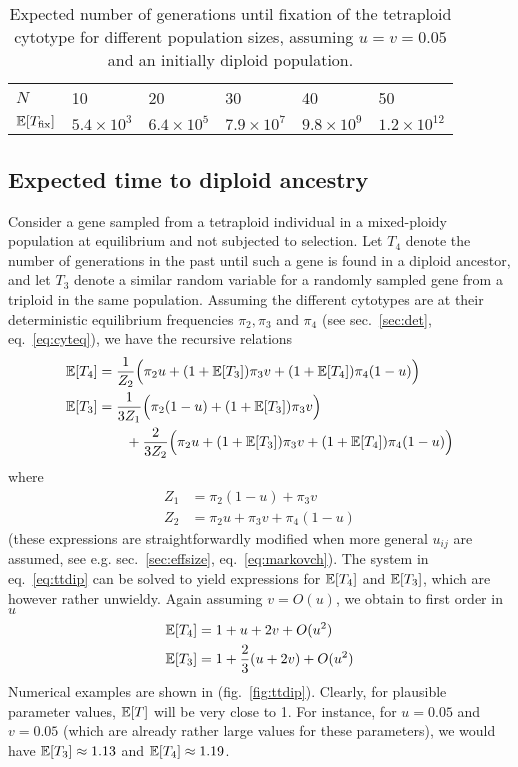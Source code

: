 \documentclass[11pt,a4paper]{article}
\begin{document}
\begin{table}[t]
\caption{
Expected number of generations until fixation of the tetraploid cytotype for
different population sizes, assuming $u=v=0.05$ and an initially diploid
population. \label{tbl:mchain-ex}
}
\begin{tabularx}{\linewidth}{XXXXXX}
\cline{1-6}
$N$ & 10 & 20 & 30 & 40 & 50 \\
\cline{1-6}
$\mathbb{E}[T_{\text{fix}}]$ & $5.4 \times 10^3$ & $6.4 \times 10^5$ & 
    $7.9 \times 10^7$ & $9.8 \times 10^9$ & $1.2 \times 10^{12}$ 
\end{tabularx}
\end{table}

\subsection{Expected time to diploid ancestry \label{sec:ttdip}}

Consider a gene sampled from a tetraploid individual in a mixed-ploidy
population at equilibrium and not subjected to selection. Let \(T_4\)
denote the number of generations in the past until such a gene is found
in a diploid ancestor, and let \(T_3\) denote a similar random variable
for a randomly sampled gene from a triploid in the same population.
Assuming the different cytotypes are at their deterministic equilibrium
frequencies \(\pi_2, \pi_3\) and \(\pi_4\) (see sec.~\ref{sec:det},
eq.~\ref{eq:cyteq}), we have the recursive relations \begin{align}
  \mathbb{E}[T_4] &= \frac{1}{Z_2}\Big(\pi_2u + (1+\mathbb{E}[T_3])\pi_3 v +
    (1+\mathbb{E}[T_4])\pi_4(1-u)\Big) \nonumber \\
  \mathbb{E}[T_3] &= \frac{1}{3Z_1}\Big(\pi_2(1-u) + (1+\mathbb{E}[T_3])\pi_3 v\Big)
  \nonumber
    \\ &\qquad + \frac{2}{3Z_2}\Big(\pi_2 u + (1+\mathbb{E}[T_3])\pi_3 v +
      (1+\mathbb{E}[T_4])\pi_4(1-u)\Big) \label{eq:ttdip}
\end{align} where \begin{align*}
  Z_1 &= \pi_2(1-u) + \pi_3v \\
  Z_2 &= \pi_2u + \pi_3v + \pi_4(1-u)
\end{align*} (these expressions are straightforwardly modified when more
general \(u_{ij}\) are assumed, see e.g. sec.~\ref{sec:effsize},
eq.~\ref{eq:markovch}). The system in eq.~\ref{eq:ttdip} can be solved
to yield expressions for \(\mathbb{E}[T_4]\) and \(\mathbb{E}[T_3]\), which are
however rather unwieldy. Again assuming \(v=O(u)\), we obtain to first
order in \(u\) \begin{align*}
\mathbb{E}[T_4] &= 1 + u + 2v + O(u^2) \\
\mathbb{E}[T_3] &= 1 + \frac{2}{3}(u + 2v) + O(u^2) 
\end{align*} Numerical examples are shown in (fig.~\ref{fig:ttdip}).
Clearly, for plausible parameter values, \(\mathbb{E}[T]\) will be very close
to 1. For instance, for \(u=0.05\) and \(v=0.05\) (which are already
rather large values for these parameters), we would have
\(\mathbb{E}[T_3] \approx 1.13\) and \(\mathbb{E}[T_4] \approx 1.19\).
\end{document}

